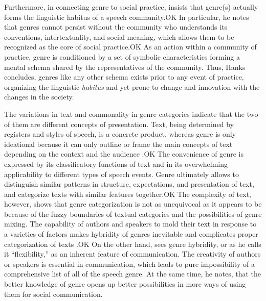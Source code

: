 \documentclass[12pt]{turabian-researchpaper}
\begin{document}
Furthermore, in connecting genre to social practice, \textcite{hanks1987} insists that genre(s) actually forms the linguistic habitus of a speech community.OK In particular, he notes that genres cannot persist without the community who understands its conventions, intertextuality, and social meaning, which allows them to be recognized as the core of social practice.OK As an action within a community of practice, genre is conditioned by a set of symbolic characteristics forming a mental schema shared by the representatives of the community. Thus, Hanks concludes, genres like any other schema exists prior to any event of practice, organizing the linguistic \textit{habitus} and yet prone to change and innovation with the changes in the society.

The variations in text and commonality in genre categories indicate that the two of them are different concepts of presentation. Text, being determined by registers and styles of speech, is a concrete product, whereas genre is only ideational because it can only outline or frame the main concepts of text depending on the context and the audience \parencite{bax2011}.OK  The convenience of genre is expressed by its classificatory functions of text and in its overwhelming applicability to different types of speech events. Genre ultimately allows to distinguish similar patterns in structure, expectations, and presentation of text, and categorize texts with similar features together.OK The complexity of text, however, shows that genre categorization is not as unequivocal as it appears to be because of the fuzzy boundaries of textual categories and the possibilities of genre mixing. The capability of authors and speakers to mold their text in response to a varieties of factors makes hybridity of genres inevitable and complicates proper categorization of texts \parencite{bax2011}.OK On the other hand, \textcite{bakhtin1986} sees genre hybridity, or as he calls it ``flexibility,'' as an inherent feature of communication. The creativity of authors or speakers is essential in communication, which leads to pure impossibility of a comprehensive list of all of the speech genre. At the same time, he notes, that the better knowledge of genre opens up better possibilities in more ways of using them for social communication.
\end{document}
